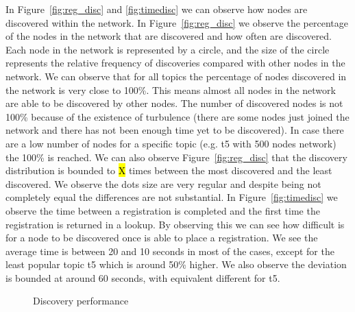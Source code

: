 In Figure~\ref{fig:reg_disc} and \ref{fig:timedisc} we can observe how nodes are discovered within the network.
In Figure~\ref{fig:reg_disc} we observe the percentage of the nodes in the network that are discovered and how often are discovered.
Each node in the network is represented by a circle, and the size of the circle represents the relative frequency of discoveries compared with other nodes in the network.
We can observe that for all topics the percentage of nodes discovered in the network is very close to 100\%. This means almost all nodes in the network are able to be discovered by other nodes. The number of discovered nodes is not 100\% because of the existence of turbulence (there are some nodes just joined the network and there has not been enough time yet to be discovered). In case there are a low number of nodes for a specific topic (e.g. t5 with 500 nodes network) the 100\% is reached.
We can also observe Figure~\ref{fig:reg_disc} that the discovery distribution is bounded to \hl{X} times between the most discovered and the least discovered.
We observe the dots size are very regular and despite being not completely equal the differences are not substantial. 
In Figure~\ref{fig:timedisc} we observe the time between a registration is completed and the first time the registration
is returned in a lookup.
By observing this we can see how difficult is for a node to be discovered once is able to place a registration. 
We see the average time is between 20 and 10 seconds in most of the cases, except for the least popular topic t5 which is around 50\% higher. 
We also observe the deviation is bounded at around 60 seconds, with equivalent different for t5.


\begin{figure}[!h]
\centering
{} 
\hspace{-0.25cm}
 \caption{Discovery performance} 
\label{fig:discovery}
\vspace{-0.15in}
\end{figure}   


